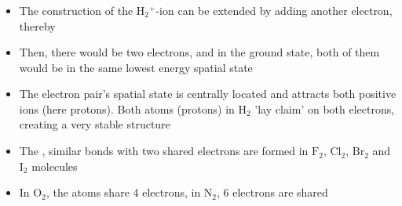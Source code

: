 \begin{frame}
\frametitle{\texorpdfstring{\culine[\sectiontitleulinecolor]{\sectiontitle}}{\sectiontitle} }

\begin{itemize}
	\item The construction of the $\mathrm{H}_{2}{ }^{+}$-ion can be extended by adding another electron, thereby  
	
	\item Then, there would be two electrons, and in the ground state, both of them would be in the same lowest energy spatial state 

\item The electron pair's spatial state is centrally located and attracts both positive ions (here protons). Both atoms (protons) in $\mathrm{H}_{2}$ 'lay claim' on both electrons, creating a very stable structure

\item The , similar bonds with two shared electrons are formed in $\mathrm{F}_{2}$, $\mathrm{Cl}_{2}$, $\mathrm{Br}_{2}$ and $\mathrm{I}_{2}$ molecules

\item In $\mathrm{O}_{2}$, the atoms share 4 electrons, in $\mathrm{N}_{2}$, 6 electrons are shared
\end{itemize}


\endofslide 
\end{frame}

